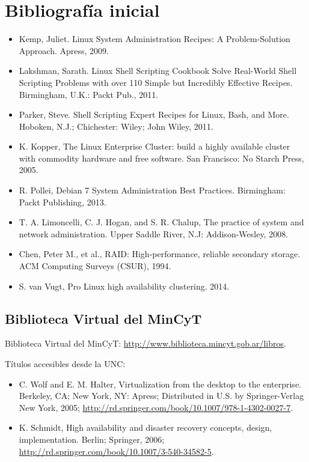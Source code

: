 \section {Bibliografía inicial}
\begin{itemize}
	\item Kemp, Juliet. Linux System Administration Recipes: A Problem-Solution Approach. Apress, 2009. 
	\item Lakshman, Sarath. Linux Shell Scripting Cookbook Solve Real-World Shell Scripting Problems with over 110 Simple but Incredibly Effective Recipes. Birmingham, U.K.: Packt Pub., 2011. 
	\item Parker, Steve. Shell Scripting Expert Recipes for Linux, Bash, and More. Hoboken, N.J.; Chichester: Wiley; John Wiley, 2011.
	\item K. Kopper, The Linux Enterprise Cluster: build a highly available cluster with commodity hardware and free software. San Francisco: No Starch Press, 2005.
	\item R. Pollei, Debian 7 System Administration Best Practices. Birmingham: Packt Publishing, 2013.
	\item T. A. Limoncelli, C. J. Hogan, and S. R. Chalup, The practice of system and network administration. Upper Saddle River, N.J: Addison-Wesley, 2008.
	\item Chen, Peter M., et al., RAID: High-performance, reliable secondary storage. ACM Computing Surveys (CSUR), 1994.
	\item S. van Vugt, Pro Linux high availability clustering. 2014.


\end{itemize}

\subsection{Biblioteca Virtual del MinCyT}

Biblioteca Virtual del MinCyT: \url{http://www.biblioteca.mincyt.gob.ar/libros}.

Títulos accesibles desde la UNC:

\begin{itemize}
	\item C. Wolf and E. M. Halter, Virtualization from the desktop to the enterprise. Berkeley, CA; New York, NY: Apress; Distributed in U.S. by Springer-Verlag New York, 2005; \url{http://rd.springer.com/book/10.1007/978-1-4302-0027-7}.
	\item K. Schmidt, High availability and disaster recovery concepts, design, implementation. Berlin; Springer, 2006; \url{http://rd.springer.com/book/10.1007/3-540-34582-5}.	
\end{itemize}
